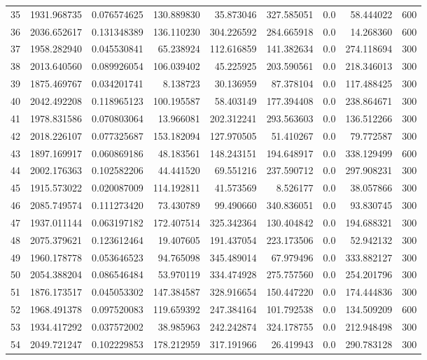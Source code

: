 \begin{longtable}{rrrrrrrrr}
35 & 1931.968735 & 0.076574625 & 130.889830 & 35.873046 & 327.585051 & 0.0 & 58.444022 & 600 \\
36 & 2036.652617 & 0.131348389 & 136.110230 & 304.226592 & 284.665918 & 0.0 & 14.268360 & 600 \\
37 & 1958.282940 & 0.045530841 & 65.238924 & 112.616859 & 141.382634 & 0.0 & 274.118694 & 300 \\
38 & 2013.640560 & 0.089926054 & 106.039402 & 45.225925 & 203.590561 & 0.0 & 218.346013 & 300 \\
39 & 1875.469767 & 0.034201741 & 8.138723 & 30.136959 & 87.378104 & 0.0 & 117.488425 & 300 \\
40 & 2042.492208 & 0.118965123 & 100.195587 & 58.403149 & 177.394408 & 0.0 & 238.864671 & 300 \\
41 & 1978.831586 & 0.070803064 & 13.966081 & 202.312241 & 293.563603 & 0.0 & 136.512266 & 300 \\
42 & 2018.226107 & 0.077325687 & 153.182094 & 127.970505 & 51.410267 & 0.0 & 79.772587 & 300 \\
43 & 1897.169917 & 0.060869186 & 48.183561 & 148.243151 & 194.648917 & 0.0 & 338.129499 & 600 \\
44 & 2002.176363 & 0.102582206 & 44.441520 & 69.551216 & 237.590712 & 0.0 & 297.908231 & 300 \\
45 & 1915.573022 & 0.020087009 & 114.192811 & 41.573569 & 8.526177 & 0.0 & 38.057866 & 300 \\
46 & 2085.749574 & 0.111273420 & 73.430789 & 99.490660 & 340.836051 & 0.0 & 93.830745 & 300 \\
47 & 1937.011144 & 0.063197182 & 172.407514 & 325.342364 & 130.404842 & 0.0 & 194.688321 & 300 \\
48 & 2075.379621 & 0.123612464 & 19.407605 & 191.437054 & 223.173506 & 0.0 & 52.942132 & 300 \\
49 & 1960.178778 & 0.053646523 & 94.765098 & 345.489014 & 67.979496 & 0.0 & 333.882127 & 300 \\
50 & 2054.388204 & 0.086546484 & 53.970119 & 334.474928 & 275.757560 & 0.0 & 254.201796 & 300 \\
51 & 1876.173517 & 0.045053302 & 147.384587 & 328.916654 & 150.447220 & 0.0 & 174.444836 & 300 \\
52 & 1968.491378 & 0.097520083 & 119.659392 & 247.384164 & 101.792538 & 0.0 & 134.509209 & 600 \\
53 & 1934.417292 & 0.037572002 & 38.985963 & 242.242874 & 324.178755 & 0.0 & 212.948498 & 300 \\
54 & 2049.721247 & 0.102229853 & 178.212959 & 317.191966 & 26.419943 & 0.0 & 290.783128 & 300 \\

\end{longtable}
